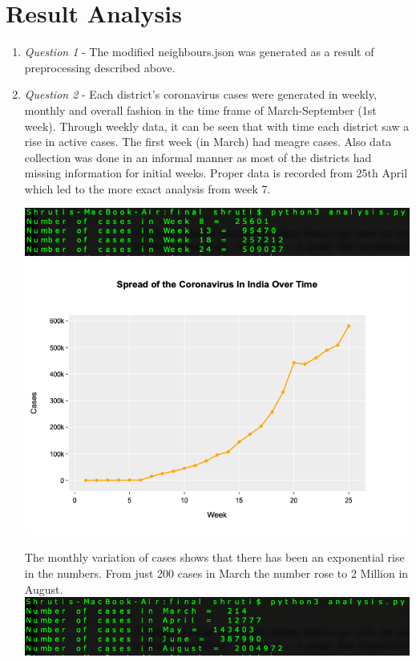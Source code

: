 \documentclass[11pt]{article}
\begin{document}
\section{Result Analysis}
\begin{enumerate}

\item \textit{Question 1} - The modified neighbours.json was generated as a result of preprocessing described above.

\item \textit{Question 2} - Each district's coronavirus cases were generated in weekly, monthly and overall fashion in the time frame of March-September (1st week).
Through weekly data, it can be seen that with time each district saw a rise in active cases. The first week (in March) had meagre cases. Also data collection was done in an informal manner as most of the districts had missing information for initial weeks. Proper data is recorded from 25th April which led to the more exact analysis from week 7.
\begin{flushleft}
\includegraphics[scale=0.42]{week-cases}
\includegraphics[scale=0.43]{Unknown-2.png}
\end{flushleft}

The monthly variation of cases shows that there has been an exponential rise in the numbers. From just 200 cases in March the number rose to 2 Million in August. \linebreak
\includegraphics[scale=0.42]{month-cases}


\end{enumerate}
\end{document}

